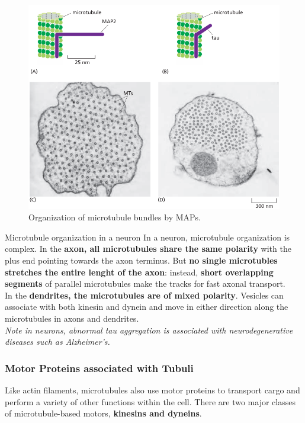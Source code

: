 \documentclass[../main.tex]{subfiles}
\begin{document}
\begin{figure}[H]
	\centering
	\includegraphics[width = 0.7 \textwidth]{29}
	\caption{Organization of microtubule bundles by MAPs.}
	\label{organizationMAPs}
\end{figure}


\begin{RemarkWithTitel}{Microtubule organization in a neuron}
	In a neuron, microtubule organization is complex. In the \textbf{axon, all microtubules share the same polarity} with the plus end pointing towards the axon terminus. But \textbf{no single microtubles stretches the entire lenght of the axon}: instead, \textbf{short overlapping segments} of parallel microtubules make the tracks for fast axonal transport. \\
	\indent In the \textbf{dendrites, the microtubules are of mixed polarity}. Vesicles can associate with both kinesin and dynein and move in either direction along the microtubules in axons and dendrites. \\
	\indent \textit{Note in neurons, abnormal tau aggregation is associated with neurodegenerative diseases such as Alzheimer's.}
\end{RemarkWithTitel}


\subsubsection{Motor Proteins associated with Tubuli}
Like actin filaments, microtubules also use motor proteins to transport cargo and perform a variety of other functions within the cell. There are two major classes of microtubule-based motors, \textbf{kinesins and dyneins}.
\end{document}
